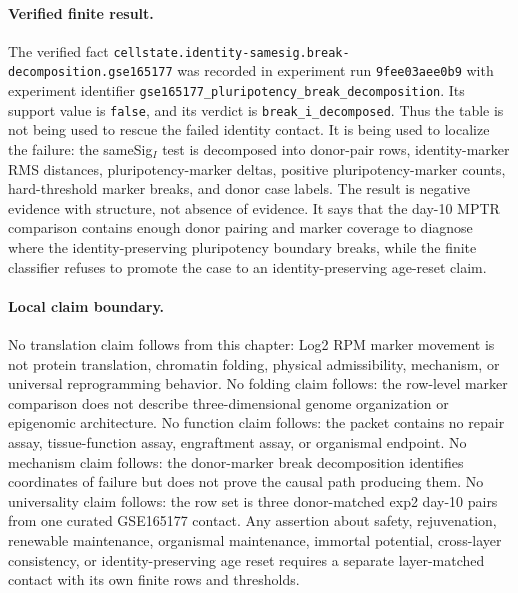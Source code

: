 \paragraph{Verified finite result.}
The verified fact \texttt{cellstate.identity-samesig.break-decomposition.gse165177} was recorded in experiment run \texttt{9fee03aee0b9} with experiment identifier \texttt{gse165177\_pluripotency\_break\_decomposition}.  Its support value is \texttt{false}, and its verdict is \texttt{break\_i\_decomposed}.  Thus the table is not being used to rescue the failed identity contact.  It is being used to localize the failure: the sameSig$_I$ test is decomposed into donor-pair rows, identity-marker RMS distances, pluripotency-marker deltas, positive pluripotency-marker counts, hard-threshold marker breaks, and donor case labels.  The result is negative evidence with structure, not absence of evidence.  It says that the day-10 MPTR comparison contains enough donor pairing and marker coverage to diagnose where the identity-preserving pluripotency boundary breaks, while the finite classifier refuses to promote the case to an identity-preserving age-reset claim.

\paragraph{Local claim boundary.}
No translation claim follows from this chapter: Log2 RPM marker movement is not protein translation, chromatin folding, physical admissibility, mechanism, or universal reprogramming behavior.  No folding claim follows: the row-level marker comparison does not describe three-dimensional genome organization or epigenomic architecture.  No function claim follows: the packet contains no repair assay, tissue-function assay, engraftment assay, or organismal endpoint.  No mechanism claim follows: the donor-marker break decomposition identifies coordinates of failure but does not prove the causal path producing them.  No universality claim follows: the row set is three donor-matched exp2 day-10 pairs from one curated GSE165177 contact.  Any assertion about safety, rejuvenation, renewable maintenance, organismal maintenance, immortal potential, cross-layer consistency, or identity-preserving age reset requires a separate layer-matched contact with its own finite rows and thresholds.
